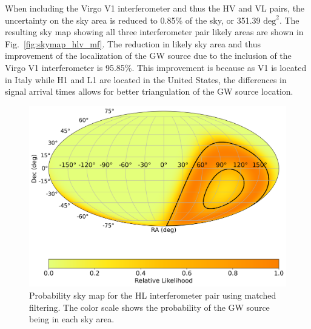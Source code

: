 \documentclass[11pt,a4paper]{article}
\begin{document}
When including the Virgo V1 interferometer and thus the HV and VL pairs, the uncertainty on the sky area is reduced to 0.85\% of the sky, or 351.39 $\mathrm{deg}^2$. The resulting sky map showing all three interferometer pair likely areas are shown in Fig.~\ref{fig:skymap_hlv_mf}. The reduction in likely sky area and thus improvement of the localization of the GW source due to the inclusion of the Virgo V1 interferometer is 95.85\%. This improvement is because as V1 is located in Italy while H1 and L1 are located in the United States, the differences in signal arrival times allows for better triangulation of the GW source location.

\begin{figure}
    \includegraphics[width=\columnwidth, keepaspectratio]{../figures/detector_skymap_HL.png}
    \caption{Probability sky map for the HL interferometer pair using matched filtering. The color scale shows the probability of the GW source being in each sky area.}
    \label{fig:skymap_hl_mf}
\end{figure}
\end{document}
